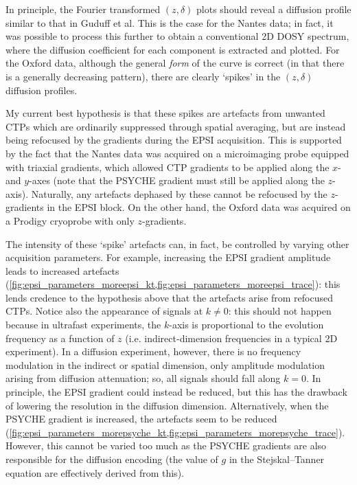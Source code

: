 In principle, the Fourier transformed $(z, \delta)$ plots should reveal a diffusion profile similar to that in Guduff et al.\autocite{Guduff2017CC}
This is the case for the Nantes data; in fact, it was possible to process this further to obtain a conventional 2D DOSY spectrum, where the diffusion coefficient for each component is extracted and plotted.
For the Oxford data, although the general \textit{form} of the curve is correct (in that there is a generally decreasing pattern), there are clearly `spikes' in the $(z,\delta)$ diffusion profiles.

My current best hypothesis is that these spikes are artefacts from unwanted CTPs which are ordinarily suppressed through spatial averaging, but are instead being refocused by the gradients during the EPSI acquisition.
This is supported by the fact that the Nantes data was acquired on a microimaging probe equipped with triaxial gradients, which allowed CTP gradients to be applied along the $x$- and $y$-axes (note that the PSYCHE gradient must still be applied along the $z$-axis).
Naturally, any artefacts dephased by these cannot be refocused by the $z$-gradients in the EPSI block.
On the other hand, the Oxford data was acquired on a Prodigy cryoprobe with only $z$-gradients.

The intensity of these `spike' artefacts can, in fact, be controlled by varying other acquisition parameters.
For example, increasing the EPSI gradient amplitude leads to increased artefacts (\cref{fig:epsi_parameters_moreepsi_kt,fig:epsi_parameters_moreepsi_trace}): this lends credence to the hypothesis above that the artefacts arise from refocused CTPs.
Notice also the appearance of signals at $k \neq 0$: this should not happen because in ultrafast experiments, the $k$-axis is proportional to the evolution frequency as a function of $z$ (i.e. indirect-dimension frequencies in a typical 2D experiment).
In a diffusion experiment, however, there is no frequency modulation in the indirect or spatial dimension, only amplitude modulation arising from diffusion attenuation; so, all signals should fall along $k = 0$.
In principle, the EPSI gradient could instead be reduced, but this has the drawback of lowering the resolution in the diffusion dimension.
Alternatively, when the PSYCHE gradient is increased, the artefacts seem to be reduced (\cref{fig:epsi_parameters_morepsyche_kt,fig:epsi_parameters_morepsyche_trace}).
However, this cannot be varied too much as the PSYCHE gradients are also responsible for the diffusion encoding (the value of $g$ in the Stejskal--Tanner equation are effectively derived from this).

